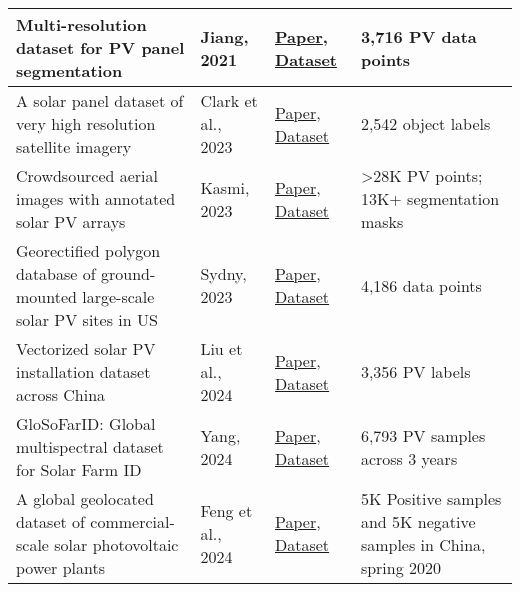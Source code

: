 \begin{multicols}{2}
\begin{table}[htbp]
\begin{tabularx}{\columnwidth}{|l|l|X|l|}
            \hline
            Multi-resolution dataset for PV panel segmentation & Jiang, 2021 & \href{https://doi.org/10.5194/essd-13-5389-2021}{Paper}, \href{https://doi.org/10.5281/zenodo.5171712}{Dataset} & 3,716 PV data points \\
            \hline
            A solar panel dataset of very high resolution satellite imagery & Clark et al., 2023 & \href{https://doi.org/10.1038/s41597-023-02539-8}{Paper}, \href{https://doi.org/10.6084/m9.figshare.22081091.v3}{Dataset} & 2,542 object labels \\
            \hline
            Crowdsourced aerial images with annotated solar PV arrays & Kasmi, 2023 & \href{https://doi.org/10.1038/s41597-023-01951-4}{Paper}, \href{https://doi.org/10.5281/zenodo.6865878}{Dataset} & >28K PV points; 13K+ segmentation masks \\
            \hline
            Georectified polygon database of ground-mounted large-scale solar PV sites in US & Sydny, 2023 & \href{https://doi.org/10.1038/s41597-023-02644-8}{Paper}, \href{https://www.sciencebase.gov/catalog/item/6671c479d34e84915adb7536}{Dataset} & 4,186 data points \\
            \hline
            Vectorized solar PV installation dataset across China & Liu et al., 2024 & \href{https://doi.org/10.1038/s41597-024-04356-z}{Paper}, \href{https://github.com/qingfengxitu/ChinaPV}{Dataset} & 3,356 PV labels \\
            \hline
            GloSoFarID: Global multispectral dataset for Solar Farm ID & Yang, 2024 & \href{https://doi.org/10.48550/arXiv.2404.05180}{Paper}, \href{https://github.com/yzyly1992/GloSoFarID/tree/main/data_coordinates}{Dataset} & 6,793 PV samples across 3 years \\
            \hline
            A global geolocated dataset of commercial-scale solar photovoltaic power plants & Feng et al., 2024 & \href{https://doi.org/10.1038/s41597-024-02994-x}{Paper}, \href{https://doi.org/10.57760/sciencedb.o00121.00001}{Dataset} & 5K Positive samples and 5K negative samples in China, spring 2020 \\
            \hline
        \end{tabularx}
        \label{tab:pv_datasets}
    \end{table}


\end{multicols}
